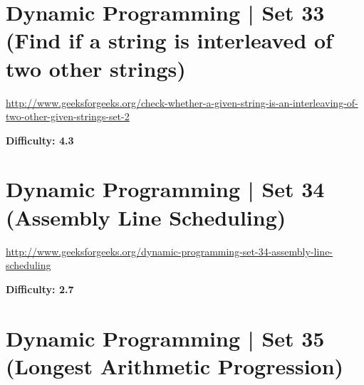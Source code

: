 \section{Dynamic Programming | Set 33 (Find if a string is interleaved of two other strings)
  \label{secGFGDPSet33FindIfStringIsInterleavedOfTwoOthers}}

\url{http://www.geeksforgeeks.org/check-whether-a-given-string-is-an-interleaving-of-two-other-given-strings-set-2}

\textbf{Difficulty: 4.3}


\textbf{}

\RayNotesBegin



\RayNotesEnd

\textbf{}


\section{Dynamic Programming | Set 34 (Assembly Line Scheduling)
  \label{secGFGDPSet34AssemLineSchedul}}

\url{http://www.geeksforgeeks.org/dynamic-programming-set-34-assembly-line-scheduling}

\textbf{Difficulty: 2.7}


\textbf{}

\RayNotesBegin



\RayNotesEnd

\textbf{}


\section{Dynamic Programming | Set 35 (Longest Arithmetic Progression)
  \label{secGFGDPSet35LongstArithProg}}

